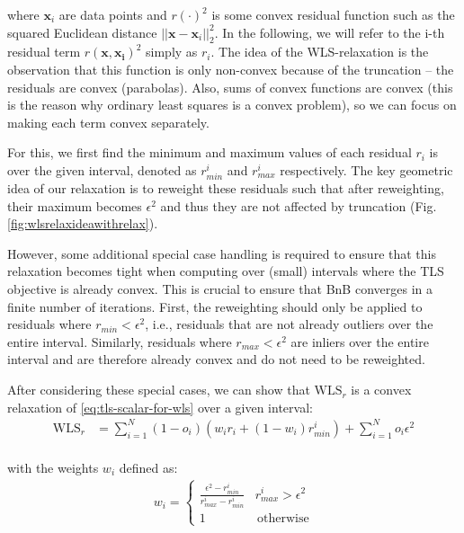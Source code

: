 where $\mathbf{x}_i$ are data points and $r(\cdot)^2$ is some convex residual function such as the squared Euclidean distance $||\mathbf{x} - \mathbf{x}_i||_2^2$. In the following, we will refer to the i-th residual term $r(\mathbf{x}, \mathbf{x_i})^2$ simply as $r_i$.
The idea of the WLS-relaxation is the observation that this function is only non-convex because of the truncation -- the residuals are convex (parabolas). Also, sums of convex functions are convex (this is the reason why ordinary least squares is a convex problem), so we can focus on making each term convex separately.

For this, we first find the minimum and maximum values of each residual $r_i$ is over the given interval, denoted as $r_{min}^i$ and $r_{max}^i$ respectively. The key geometric idea of our relaxation is to reweight these residuals such that after reweighting, their maximum becomes $\epsilon^2$ and thus they are not affected by truncation (Fig. \ref{fig:wlsrelaxideawithrelax}).

However, some additional special case handling is required to ensure that this relaxation becomes tight when computing over (small) intervals where the TLS objective is already convex. This is crucial to ensure that BnB converges in a finite number of iterations. First, the reweighting should only be applied to residuals where $r_{min} < \epsilon^2$, i.e., residuals that are not already outliers over the entire interval. Similarly, residuals where $r_{max} < \epsilon^2$ are inliers over the entire interval and are therefore already convex and do not need to be reweighted.

After considering these special cases, we can show that $\text{WLS}_{r}$ is a convex relaxation of \ref{eq:tls-scalar-for-wls} over a given interval:
\begin{equation}
	\label{eq:tls-wls-relaxation1}
	\begin{aligned}	
		\text{WLS}_{r} &= 
		\sum_{i=1}^{N} (1 - o_i) \left(w_i r_i  + (1 - w_i) r_{min}^i \right) + \sum_{i=1}^{N} o_i\epsilon^2\\
	\end{aligned}
\end{equation}

with the weights $w_i$ defined as:
\begin{equation}
	\begin{aligned}	
		w_i  = 
		\begin{cases}
			\frac{\epsilon^2 - r_{min}^i}{r_{max}^i - r_{min}^i} &  r_{max}^i > \epsilon^2\\
			1 & \, \text{otherwise}
		\end{cases}
	\end{aligned}
\end{equation}

